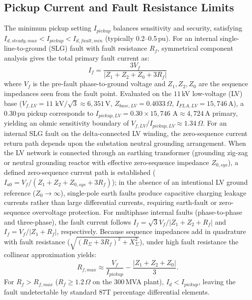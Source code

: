\documentclass[12pt,a4paper,oneside]{report}
\begin{document}
\subsection{Pickup Current and Fault Resistance Limits}
The minimum pickup setting $I_{pickup}$ balances sensitivity and security, satisfying $I_{d,steady,max} < I_{pickup} < I_{d,fault,min}$ (typically 0.2--0.5\,pu). For an internal single-line-to-ground (SLG) fault with fault resistance $R_f$, symmetrical component analysis gives the total primary fault current as:
\begin{equation}
I_f = \frac{3 V_f}{|Z_1 + Z_2 + Z_0 + 3 R_f|}
\end{equation}
where $V_f$ is the pre-fault phase-to-ground voltage and $Z_1, Z_2, Z_0$ are the sequence impedances seen from the fault point. Evaluated on the $11$\,kV low-voltage (LV) base ($V_{f,LV} = 11\text{ kV}/\sqrt{3} \approx 6{,}351$\,V, $Z_{base,LV} = 0.4033\,\Omega$, $I_{FLA,LV} = 15{,}746$\,A), a $0.30$\,pu pickup corresponds to $I_{pickup,LV} = 0.30 \times 15{,}746\text{ A} \approx 4{,}724$\,A primary, yielding an ohmic sensitivity boundary of $V_{f,LV} / I_{pickup,LV} \approx 1.34\,\Omega$. For an internal SLG fault on the delta-connected LV winding, the zero-sequence current return path depends upon the substation neutral grounding arrangement. When the LV network is connected through an earthing transformer (grounding zig-zag or neutral grounding reactor with effective zero-sequence impedance $Z_{0,sys}$), a defined zero-sequence current path is established ($I_{a0} = V_f / (Z_1 + Z_2 + Z_{0,sys} + 3R_f)$); in the absence of an intentional LV ground reference ($Z_0 \to \infty$), single-pole earth faults produce capacitive charging leakage currents rather than large differential currents, requiring earth-fault or zero-sequence overvoltage protection. For multiphase internal faults (phase-to-phase and three-phase), the fault current follows $I_f = \sqrt{3}V_f / |Z_1 + Z_2 + R_f|$ and $I_f = V_f / |Z_1 + R_f|$, respectively. Because sequence impedances add in quadrature with fault resistance ($\sqrt{(R_\Sigma + 3R_f)^2 + X_\Sigma^2}$), under high fault resistance the collinear approximation yields:
\begin{equation}
R_{f,max} \approx \frac{V_f}{I_{pickup}} - \frac{|Z_1 + Z_2 + Z_0|}{3}.
\end{equation}
For $R_f > R_{f,max}$ ($R_f \ge 1.2\,\Omega$ on the 300\,MVA plant), $I_d < I_{pickup}$, leaving the fault undetectable by standard 87T percentage differential elements.
\end{document}
